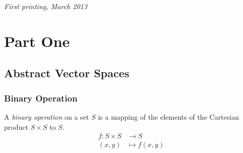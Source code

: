 \documentclass[11pt,fleqn]{book} %
\begin{document}
\noindent \textit{First printing, March 2013} %




\pagestyle{empty} %

\tableofcontents %

\cleardoublepage %

\pagestyle{fancy} %


\part{Part One}



\chapter{Abstract Vector Spaces}

\section{Binary Operation}

\begin{definition}
    A \emph{binary operation} on a set $S$ is a mapping of the elements of the Cartesian product $S \times S$ to $S$.
    \[ \begin{split}
            f : S \times S & \to S \\ (x,y) &\mapsto f(x,y)
        \end{split}\]
\end{definition}
\end{document}
